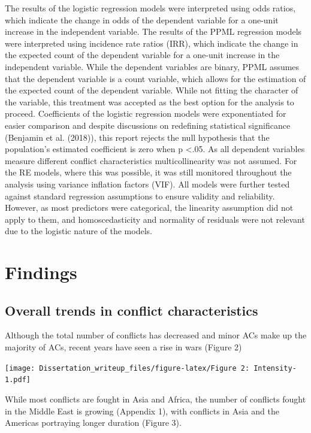 \documentclass[
]{article}
\begin{document}
The results of the logistic regression models were interpreted using
odds ratios, which indicate the change in odds of the dependent variable
for a one-unit increase in the independent variable. The results of the
PPML regression models were interpreted using incidence rate ratios
(IRR), which indicate the change in the expected count of the dependent
variable for a one-unit increase in the independent variable. While the
dependent variables are binary, PPML assumes that the dependent variable
is a count variable, which allows for the estimation of the expected
count of the dependent variable. While not fitting the character of the
variable, this treatment was accepted as the best option for the
analysis to proceed. Coefficients of the logistic regression models were
exponentiated for easier comparison and despite discussions on
redefining statistical significance (Benjamin et al. (2018)), this
report rejects the null hypothesis that the population's estimated
coefficient is zero when p \textless.05. As all dependent variables
measure different conflict characteristics multicollinearity was not
assumed. For the RE models, where this was possible, it was still
monitored throughout the analysis using variance inflation factors
(VIF). All models were further tested against standard regression
assumptions to ensure validity and reliability. However, as most
predictors were categorical, the linearity assumption did not apply to
them, and homoscedasticity and normality of residuals were not relevant
due to the logistic nature of the models.

\section{Findings}\label{findings}

\subsection{Overall trends in conflict
characteristics}\label{overall-trends-in-conflict-characteristics}

Although the total number of conflicts has decreased and minor ACs make
up the majority of ACs, recent years have seen a rise in wars (Figure 2)

\texttt{[image: Dissertation\_writeup\_files/figure-latex/Figure 2: Intensity-1.pdf]}

While most conflicts are fought in Asia and Africa, the number of
conflicts fought in the Middle East is growing (Appendix 1), with
conflicts in Asia and the Americas portraying longer duration (Figure
3).
\end{document}

